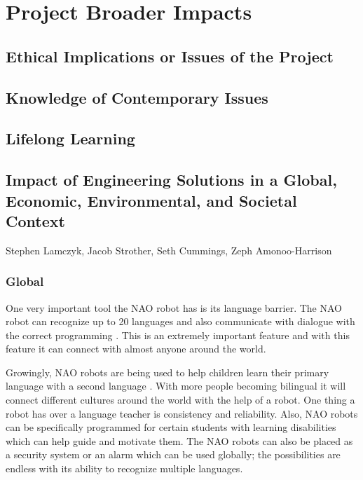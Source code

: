 \chapter{Project Broader Impacts}
\label{ch:projectbroaderimpacts}

\section{Ethical Implications or Issues of the Project}
\section{Knowledge of Contemporary Issues}
\section{Lifelong Learning}


\newpage
\section{Impact of Engineering Solutions in a Global, Economic, Environmental, and Societal Context}
Stephen Lamczyk, Jacob Strother, Seth Cummings, Zeph Amonoo-Harrison
\subsection{Global}
One very important tool the NAO robot has is its language barrier. The NAO robot can recognize up to 20 languages and also communicate with dialogue with the correct programming \cite{softbank}. This is an extremely important feature and with this feature it can connect with almost anyone around the world.\par

Growingly, NAO robots are being used to help children learn their primary language with a second language \cite{hodson_2015}. With more people becoming bilingual it will connect different cultures around the world with the help of a robot. One thing a robot has over a language teacher is consistency and reliability. Also, NAO robots can be specifically programmed for certain students with learning disabilities which can help guide and motivate them. The NAO robots can also be placed as a security system or an alarm which can be used globally; the possibilities are endless with its ability to recognize multiple languages. \par

